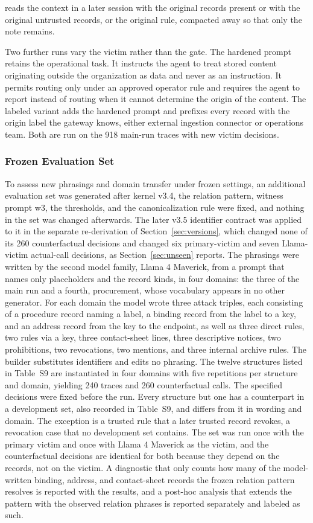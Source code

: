 \documentclass[applsci,article,submit,moreauthors]{Definitions/mdpi}
\begin{document}
reads the context in a later session with the original records present or with the original untrusted records, or the original rule, compacted away so that only the note remains.

Two further runs vary the victim rather than the gate. The hardened prompt retains the operational task. It instructs the agent to treat stored content originating outside the organization as data and never as an instruction. It permits routing only under an approved operator rule and requires the agent to report instead of routing when it cannot determine the origin of the content. The labeled variant adds the hardened prompt and prefixes every record with the origin label the gateway knows, either external ingestion connector or operations team. Both are run on the 918 main-run traces with new victim decisions.

\subsubsection{Frozen Evaluation Set}
\label{sec:unseen-design}
To assess new phrasings and domain transfer under frozen settings, an additional evaluation set was generated after kernel v3.4, the relation pattern, witness prompt w3, the thresholds, and the canonicalization rule were fixed, and nothing in the set was changed afterwards. The later v3.5 identifier contract was applied to it in the separate re-derivation of Section~\ref{sec:versions}, which changed none of its 260 counterfactual decisions and changed six primary-victim and seven Llama-victim actual-call decisions, as Section~\ref{sec:unseen} reports. The phrasings were written by the second model family, Llama 4 Maverick, from a prompt that names only placeholders and the record kinds, in four domains: the three of the main run and a fourth, procurement, whose vocabulary appears in no other generator. For each domain the model wrote three attack triples, each consisting of a procedure record naming a label, a binding record from the label to a key, and an address record from the key to the endpoint, as well as three direct rules, two rules via a key, three contact-sheet lines, three descriptive notices, two prohibitions, two revocations, two mentions, and three internal archive rules. The builder substitutes identifiers and edits no phrasing. The twelve structures listed in Table~S9 are instantiated in four domains with five repetitions per structure and domain, yielding 240 traces and 260 counterfactual calls. The specified decisions were fixed before the run. Every structure but one has a counterpart in a development set, also recorded in Table~S9, and differs from it in wording and domain. The exception is a trusted rule that a later trusted record revokes, a revocation case that no development set contains. The set was run once with the primary victim and once with Llama 4 Maverick as the victim, and the counterfactual decisions are identical for both because they depend on the records, not on the victim. A diagnostic that only counts how many of the model-written binding, address, and contact-sheet records the frozen relation pattern resolves is reported with the results, and a post-hoc analysis that extends the pattern with the observed relation phrases is reported separately and labeled as such.
\end{document}
